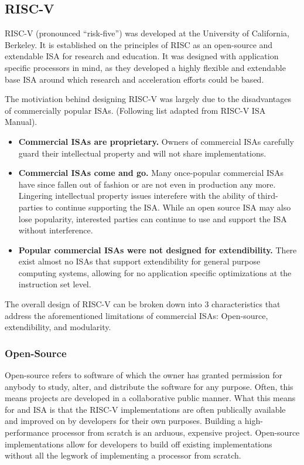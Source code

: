 \subsection{RISC-V}

    \glsdesc{RISC-V} (pronounced ``risk-five'') was developed at the University of California, Berkeley. It is established on the principles of RISC as an open-source and extendable \gls{ISA} for research and education. It was designed with application specific processors in mind, as they developed a highly flexible and extendable base \gls{ISA} around which research and acceleration efforts could be based.

    The motiviation behind designing RISC-V was largely due to the disadvantages of commercially popular \glspl{ISA}.\cite{Isa2012} (Following list adapted from RISC-V ISA Manual).
    \begin{itemize}
    \item \textbf{Commercial ISAs are proprietary.} Owners of commercial ISAs carefully guard their intellectual property and will not share implementations. 
    \item \textbf{Commercial ISAs come and go.} Many once-popular commercial ISAs have since fallen out of fashion or are not even in production any more. Lingering intellectual property issues interefere with the ability of third-parties to continue supporting the ISA. While an open source \gls{ISA} may also lose popularity, interested parties can continue to use and support the ISA without interference.
    \item \textbf{Popular commercial ISAs were not designed for extendibility.} There exist almost no ISAs that support extendibility for general purpose computing systems, allowing for no application specific optimizations at the instruction set level.
    \end{itemize}

    The overall design of RISC-V can be broken down into 3 characteristics that address the aforementioned limitations of commercial \glspl{ISA}: Open-source, extendibility, and modularity.

    \subsubsection{Open-Source}
        Open-source refers to software of which the owner has granted permission for anybody to study, alter, and distribute the software for any purpose. Often, this means projects are developed in a collaborative public manner. What this means for and ISA is that the RISC-V implementations are often publically available and improved on by developers for their own purposes. Building a high-performance processor from scratch is an arduous, expensive project. Open-source implementations allow for developers to build off existing implementations without all the legwork of implementing a processor from scratch.

